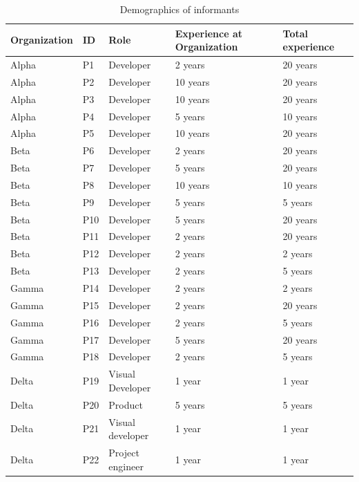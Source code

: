 \documentclass[smallextended]{svjour3}
\begin{document}
\begin{table}[!h]
\footnotesize
    \centering
    \caption{Demographics of informants}
    \label{tab:informants}
    \begin{tabular}{p{1.5cm}p{0.6cm}p{2.5cm}p{3.5cm}p{2cm}}
\toprule
Organization & ID & Role & Experience at Organization & Total experience\\
\midrule 
Alpha & P1 & Developer & 2 years & 20 years\\
Alpha & P2 & Developer & 10 years & 20 years\\
Alpha & P3 & Developer & 10 years & 20 years\\
Alpha & P4 & Developer & 5 years & 10 years\\
Alpha & P5 & Developer & 10 years & 20 years\\
Beta & P6 & Developer & 2 years & 20 years\\
Beta  & P7 & Developer & 5 years & 20 years\\
Beta  & P8 & Developer & 10 years & 10 years\\
Beta & P9 & Developer & 5 years & 5 years\\
Beta & P10 & Developer & 5 years & 20 years\\
Beta & P11 & Developer & 2 years & 20 years\\
Beta & P12 & Developer & 2 years & 2 years\\
Beta & P13 & Developer & 2 years & 5 years\\
Gamma & P14 & Developer & 2 years & 2 years\\
Gamma & P15 & Developer & 2 years & 20 years\\
Gamma & P16 & Developer & 2 years & 5 years\\
Gamma & P17 & Developer & 5 years & 20 years\\
Gamma & P18 & Developer & 2 years & 5 years\\
Delta & P19 & Visual Developer & 1 year & 1 year\\
Delta & P20 & Product  & 5 years & 5 years\\
Delta & P21 & Visual developer & 1 year & 1 year\\
Delta & P22 & Project engineer & 1 year & 1 year\\

\end{tabular}
\end{table}
\end{document}
